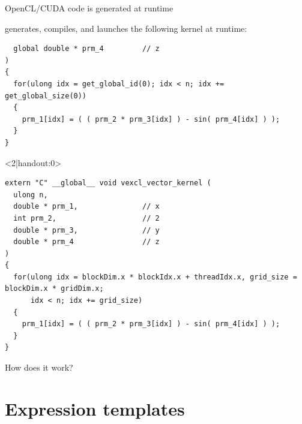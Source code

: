 \documentclass[@BEAMER_OPTIONS@]{beamer}
\begin{document}
\begin{frame}[fragile]{OpenCL/CUDA code is generated at runtime}
\begin{exampleblock}{generates, compiles, and launches the following kernel
        at runtime:}
\begin{onlyenv}
\begin{lstlisting}
  global double * prm_4         // z
)
{
  for(ulong idx = get_global_id(0); idx < n; idx += get_global_size(0))
  {
    prm_1[idx] = ( ( prm_2 * prm_3[idx] ) - sin( prm_4[idx] ) );
  }
}
            \end{lstlisting}
        \end{onlyenv}
        \begin{onlyenv}<2|handout:0>
            \begin{lstlisting}
extern "C" __global__ void vexcl_vector_kernel (
  ulong n,
  double * prm_1,               // x
  int prm_2,                    // 2
  double * prm_3,               // y
  double * prm_4                // z
)
{
  for(ulong idx = blockDim.x * blockIdx.x + threadIdx.x, grid_size = blockDim.x * gridDim.x;
      idx < n; idx += grid_size)
  {
    prm_1[idx] = ( ( prm_2 * prm_3[idx] ) - sin( prm_4[idx] ) );
  }
}
            \end{lstlisting}
        \end{onlyenv}
    \end{exampleblock}
\end{frame}

\note{ }

\begin{frame}
    \begin{center}
        \huge{How does it work?}
    \end{center}
\end{frame}

\note{ }

\section{Expression templates}
\begin{frame}
    \sectionpage
\end{frame}

\note{}
\end{document}
